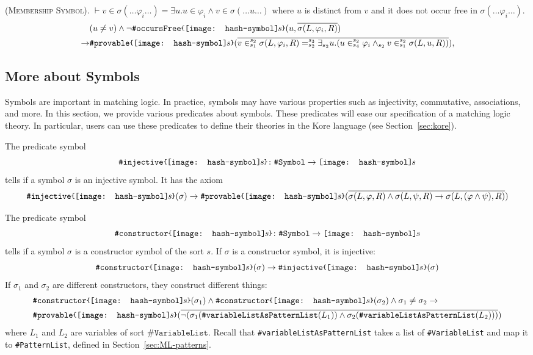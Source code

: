 \documentclass[UTF8,11pt]{article}
\theoremstyle{plain}
\theoremstyle{definition}
\theoremstyle{remark}
\newcommand{\parametric}[2]{{#1}\raisebox{.2ex}{\texttt{\footnotesize{\{}}}#2\raisebox{.2ex}{\texttt{\footnotesize{\}}}}}
\newcommand{\shp}{\texttt{[image: hash-symbol]}\kern-0.1em}
\newcommand{\sharpsymbol}{\#}
\newcommand{\shs}{\shp s}
\newcommand{\Kconstructor}{\texttt{\sharpsymbol constructor}}
\newcommand{\KconstructorP}[1]{\parametric{\Kconstructor}{#1}}
\newcommand{\Kinjective}{\texttt{\sharpsymbol injective}}
\newcommand{\KinjectiveP}[1]{\parametric{\Kinjective}{#1}}
\newcommand{\KprovableP}[1]{\parametric{\Kdeduce}{#1}}
\newcommand{\KSymbol}{\texttt{\sharpsymbol Symbol}}
\newcommand{\KPatternList}{\texttt{\sharpsymbol PatternList}}
\newcommand{\KVariableList}{\texttt{\sharpsymbol VariableList}\xspace}
\newcommand{\KVariableListAsKPatternList}
    {\texttt{\sharpsymbol variableListAsPatternList}\xspace}
\newcommand{\KoccursFree}{\texttt{\sharpsymbol occursFree}}
\newcommand{\Kdeduce}{\textup{\texttt{\sharpsymbol provable}}}
\begin{document}
(\textsc{Membership Symbol}).
$\vdash v \in \sigma(\dots \varphi_i \dots) = \exists u . u \in \varphi_i 
\wedge v \in \sigma(\dots u \dots)$ where $u$ is distinct from $v$ and it does 
not occur free in $\sigma(\dots \varphi_i \dots)$.
\begin{align*}
& (u \neq v) 
\wedge \neg \parametric{\KoccursFree}{\shs}(u, \overline{\sigma(L, \varphi_i, 
	R)})
\\
\to & \parametric{\Kdeduce}{\shs}(\overline{v \in_{s_1}^{s_2} \sigma(L, 
	\varphi_i, R) 
	=_{s_2}^{s_3} \exists_{s_2} u . (u \in_{s_4}^{s_2} \varphi_i \wedge_{s_2} v 
	\in_{s_1}^{s_2} \sigma(L, u, R))}),
\end{align*}

\subsection{More about Symbols}

Symbols are important in matching logic.
In practice, symbols may have various properties
such as injectivity, commutative, associations, and more.
In this section, we provide various predicates about symbols.
These predicates will ease our specification of a matching logic theory.
In particular, users can use these predicates to define their theories
in the Kore language (see Section~\ref{sec:kore}).

The predicate symbol
$$
\KinjectiveP{\shs} \colon \KSymbol \to \shs
$$
tells if a symbol $\sigma$ is an injective symbol.
It has the axiom
$$
\KinjectiveP{\shs}(\sigma) \to
\KprovableP{\shs}( 
\overline{
\sigma(L, \varphi, R) \wedge \sigma(L, \psi, R)
\to
\sigma(L, (\varphi \wedge \psi), R)
}
 )
$$

The predicate symbol
$$
\KconstructorP{\shs} \colon \KSymbol \to \shs
$$
tells if a symbol $\sigma$ is a constructor symbol of the sort $s$.
If $\sigma$ is a constructor symbol,
it is injective:
$$
\KconstructorP{\shs}(\sigma) \to \KinjectiveP{\shs}(\sigma) 
$$
If $\sigma_1$ and $\sigma_2$ are different constructors,
they construct different things:
\begin{align*}
&
\KconstructorP{\shs}(\sigma_1) \wedge
\KconstructorP{\shs}(\sigma_2) \wedge
\sigma_1 \neq \sigma_2 \to 
\\
&
\KprovableP{\shs}(
\overline{\neg (
  \sigma_1(\KVariableListAsKPatternList(L_1)) \wedge 
  \sigma_2(\KVariableListAsKPatternList(L_2)))}
)
\end{align*}
where $L_1$ and $L_2$ are variables of sort $\KVariableList$.
Recall that \KVariableListAsKPatternList takes a list of \KVariableList
and map it to \KPatternList, defined in Section~\ref{sec:ML-patterns}.
\end{document}
